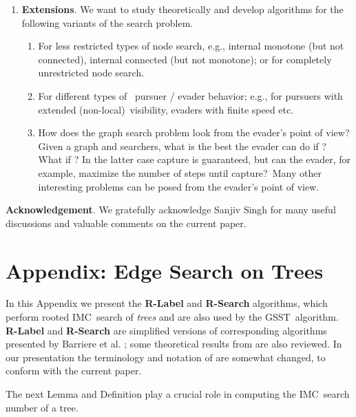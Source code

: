 \documentclass[11pt]{article}\usepackage{amsmath}
\begin{document}
\begin{enumerate}
\item \textbf{Extensions}. We want to study theoretically and develop
algorithms for the following variants of the search problem.

\begin{enumerate}
\item For less restricted types of node search, e.g., internal monotone (but
not connected), internal connected (but not monotone); or for completely
unrestricted node search.

\item For different types of \ pursuer / evader behavior; e.g., for pursuers
with extended (non-local)\ visibility, evaders with finite speed etc.

\item How does the graph search problem look from the evader's point of view?
Given a graph  and  searchers, what is the best the evader can
do if ? What if ? In the latter case capture is guaranteed, but can the evader, for
example, maximize the number of steps until capture?\ Many other interesting
problems can be posed from the evader's point of view.
\end{enumerate}
\end{enumerate}

\bigskip

\noindent\textbf{Acknowledgement}. We gratefully acknowledge Sanjiv Singh for
many useful discussions and valuable comments on the current paper.

\newpage

\appendix


\section{Appendix: Edge Search on Trees}

\label{secA}

In this Appendix we present the \textbf{R-Label} and \textbf{R-Search}
algorithms, which perform rooted IMC\ search of \emph{trees }and are also used
by the GSST\ algorithm. \textbf{R-Label} and \textbf{R-Search} are simplified
versions of corresponding algorithms presented by Barriere et al.
\cite{Barriere1}; some theoretical results from \cite{Barriere1} are also
reviewed. In our presentation the terminology and notation of \cite{Barriere1}
are somewhat changed, to conform with the current paper.

The next Lemma and Definition play a crucial role in computing the IMC\ search
number of a tree.
\end{document}
